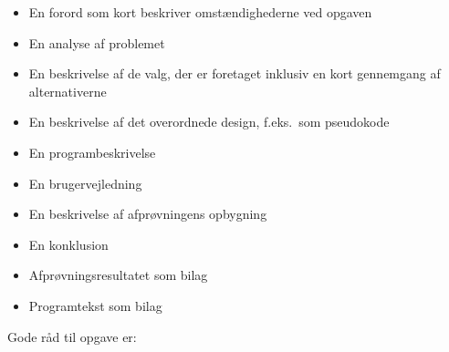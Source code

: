 \begin{itemize}
\begin{itemize}
    \item En forord som kort beskriver omstændighederne ved opgaven
    \item En analyse af problemet
    \item En beskrivelse af de valg, der er foretaget inklusiv en kort gennemgang af alternativerne
    \item En beskrivelse af det overordnede design, f.eks.\ som pseudokode
    \item En programbeskrivelse
    \item En brugervejledning
    \item En beskrivelse af afprøvningens opbygning
    \item En konklusion
    \item Afprøvningsresultatet som bilag
    \item Programtekst som bilag
    \end{itemize}
  \end{itemize}
  Gode råd til opgave er:
